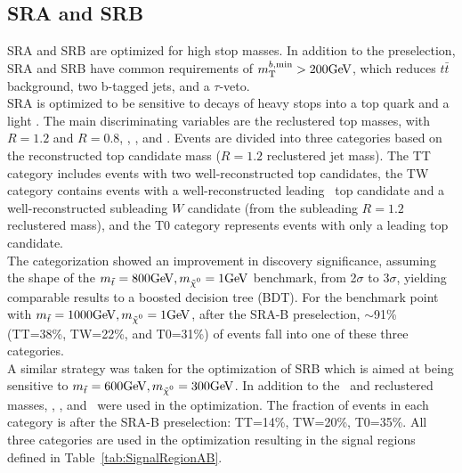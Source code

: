 \subsection{SRA and SRB}
SRA and SRB are optimized for high stop masses.  In addition to the preselection, SRA and SRB have common requirements of $\mtbmin>200\gev$, which reduces $t\bar{t}$ background,  two b-tagged jets, and a $\tau$-veto. \\

SRA is optimized to be sensitive to decays of heavy stops into a top quark and a light \LSP. The main discriminating variables are the reclustered top masses, with $R=1.2$ and $R=0.8$, \mtbmin, \drbjetbjet, and \met. Events are divided into three categories based on the reconstructed top candidate mass ($R=1.2$ reclustered jet mass). The TT category includes events with two well-reconstructed top candidates, the TW category contains events with a well-reconstructed leading \pt\ top candidate and a well-reconstructed subleading $W$ candidate (from the subleading $R=1.2$ reclustered mass), and the T0 category represents events with only a leading top candidate. \\

The categorization showed an improvement in discovery significance, assuming the shape of the $\mstop=800\gev,\mLSP=1\gev$ benchmark, from 2$\sigma$ to 3$\sigma$, yielding comparable results to a boosted decision tree (BDT). For the benchmark point with $\mstop=1000\gev,\mLSP=1\gev$, after the SRA-B preselection, $\sim$91\% (TT=38\%, TW=22\%, and T0=31\%) of events fall into one of these three categories.  \\ %

A similar strategy was taken for the optimization of SRB which is aimed at being sensitive to $\mstop=600\gev,\mLSP=300\gev$. In addition to the \met\ and reclustered masses, \mtbmax, \mtbmin, and \drbjetbjet\ were used in the optimization.  The fraction of events in each category is after the SRA-B preselection: TT=14\%, TW=20\%, T0=35\%. All three categories are used in the optimization resulting in the signal regions defined in Table~\ref{tab:SignalRegionAB}. \\

